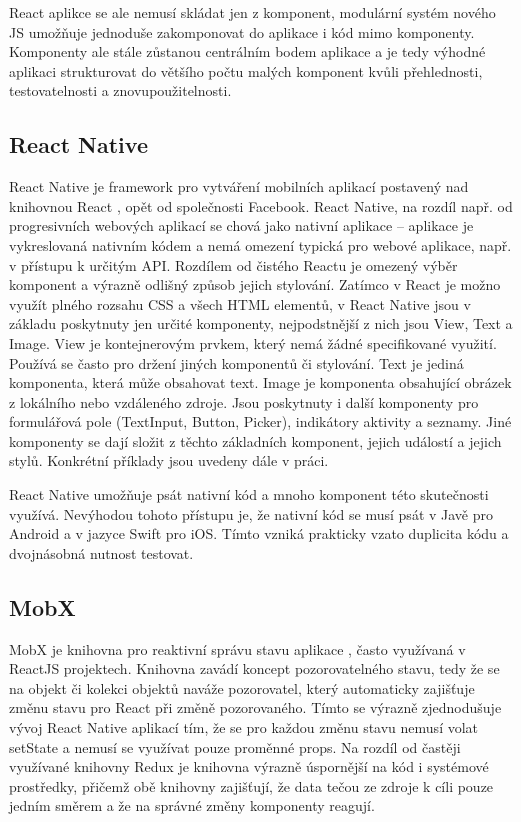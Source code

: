 React aplikce se ale nemusí skládat jen z komponent, modulární systém nového JS umožňuje jednoduše zakomponovat do aplikace i kód mimo komponenty. Komponenty ale stále zůstanou centrálním bodem aplikace a je tedy výhodné aplikaci strukturovat do většího počtu malých komponent kvůli přehlednosti, testovatelnosti a znovupoužitelnosti.

\subsection{React Native}

React Native je framework pro vytváření mobilních aplikací postavený nad knihovnou React \cite{novick2017react}, opět od společnosti Facebook. React Native, na rozdíl např. od progresivních webových aplikací se chová jako nativní aplikace -- aplikace je vykreslovaná nativním kódem a nemá omezení typická pro webové aplikace, např. v přístupu k určitým API. Rozdílem od čistého Reactu je omezený výběr komponent a výrazně odlišný způsob jejich stylování. Zatímco v React je možno využít plného rozsahu CSS a všech HTML elementů, v React Native jsou v základu poskytnuty jen určité komponenty, nejpodstnější z nich jsou View, Text a Image. View je kontejnerovým prvkem, který nemá žádné specifikované využití. Používá se často pro držení jiných komponentů či stylování. Text je jediná komponenta, která může obsahovat text. Image je komponenta obsahující obrázek z lokálního nebo vzdáleného zdroje. Jsou poskytnuty i další komponenty pro formulářová pole (TextInput, Button, Picker), indikátory aktivity a seznamy. Jiné komponenty se dají složit z těchto základních komponent, jejich událostí a jejich stylů. Konkrétní příklady jsou uvedeny dále v práci. 

React Native umožňuje psát nativní kód a mnoho komponent této skutečnosti využívá. Nevýhodou tohoto přístupu je, že nativní kód se musí psát v Javě pro Android a v jazyce Swift pro iOS. Tímto vzniká prakticky vzato duplicita kódu a dvojnásobná nutnost testovat.

\subsection{MobX}

MobX je knihovna pro reaktivní správu stavu aplikace \cite{podila2018mobx}, často využívaná v ReactJS projektech. Knihovna zavádí koncept pozorovatelného stavu, tedy že se na objekt či kolekci objektů naváže pozorovatel, který automaticky zajišťuje změnu stavu pro React při změně pozorovaného. Tímto se výrazně zjednodušuje vývoj React Native aplikací tím, že se pro každou změnu stavu nemusí volat setState a nemusí se využívat pouze proměnné props. Na rozdíl od častěji využívané knihovny Redux je knihovna výrazně úspornější na kód i systémové prostředky, přičemž obě knihovny zajišťují, že data tečou ze zdroje k cíli pouze jedním směrem a že na správné změny komponenty reagují.

